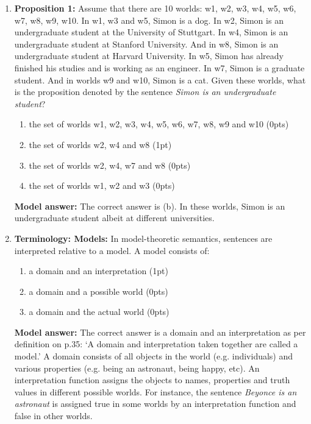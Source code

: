 \documentclass[a4,11pt]{article}
\begin{document}
\begin{enumerate}[leftmargin = 12pt]
 {\bf Model answer:} The correct answer is (a), as per the definition of a proposition on p.34. We do not know whether  \textit{Simon is an undergraduate student} is true in the actual world. But we can imagine possible worlds in which the sentence is true.
    
      \item {\bf Proposition 1:}  Assume that there are 10 worlds: w1, w2, w3, w4, w5, w6, w7, w8, w9, w10. In w1, w3 and w5, Simon is a dog. In w2, Simon is an undergraduate student at the University of Stuttgart. In w4, Simon is an undergraduate student at Stanford University. And in w8, Simon is an undergraduate student at Harvard University. In w5, Simon has already finished his studies and is working as an engineer. In w7, Simon is a graduate student. And in worlds w9 and w10, Simon is a cat.     
      Given these worlds, what is the proposition denoted by the sentence \textit{Simon is an undergraduate student}?
      
       \begin{enumerate}[noitemsep]
       \item the set of worlds w1, w2, w3, w4, w5, w6, w7, w8, w9 and w10 (0pts)
       \item the set of worlds w2, w4 and w8 (1pt)
       \item the set of worlds w2, w4, w7 and w8 (0pts)
       \item the set of worlds w1, w2 and w3 (0pts)       
    \end{enumerate}     

        {\bf Model answer:} The correct answer is (b). In these worlds, Simon is an undergraduate student albeit at different universities.

\item {\bf Terminology: Models:}  In model-theoretic semantics, sentences are interpreted relative to a model. A model consists of:
       \begin{enumerate}[noitemsep]
       \item a domain and an interpretation (1pt)
        \item a domain and a possible world (0pts)
        \item a domain and the actual world (0pts)
         \end{enumerate}
            
        {\bf Model answer:} The correct answer is a domain and an interpretation as per definition on p.35: `A domain and interpretation taken together are called a model.' A domain consists of all objects in the world (e.g. individuals) and various properties (e.g.  being an astronaut, being happy, etc). An interpretation function assigns the objects to names, properties and truth values in different possible worlds. For instance, the sentence \textit{Beyonce is an astronaut} is assigned true in some worlds by an interpretation function and false in other worlds. 
    

\end{enumerate}
\end{document}
